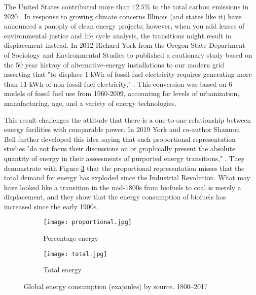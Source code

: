 The United States contributed more than $12.5\%$ to the total carbon emissions in 2020 \cite{european_commission_joint_research_centre_ghg_2021}. In response to growing climate concerns Illinois (and states like it) have announced a panoply of clean energy projects; however, when you add lenses of environmental justice and life cycle analysis, the transitions might result in displacement instead. In 2012 Richard York from the Oregon State Department of Sociology and Environmental Studies to published a cautionary study based on the 50 year histroy of alternative-energy installations to our modern grid asserting that "to displace 1 kWh of fossil-fuel electricity requires generating more than 11 kWh of non-fossil-fuel electricity," \cite{york_alternative_2012}. This conversion was based on 6 models of fossil fuel use from 1960-2009, accounting for levels of urbanization, manufacturing, age, and a variety of energy technologies.

This result challenges the attitude that there is a one-to-one relationship between energy facilities with comparable power. In 2019 York and co-author Shannon Bell further developed this idea saying that such proportional representation studies "do not focus their discussions on or graphically present the absolute quantity of energy in their assessments of purported energy transitions," \cite{york_energy_2019}. They demonstrate with Figure \ref{fig:both_plots} that the proportional representation misses that the total demand for energy has exploded since the Industrial Revolution. What may have looked like a transition in the mid-1800s from biofuels to coal is merely a displacement, and they show that the energy consumption of biofuels has increased since the early 1900s.

\begin{figure}[ht!]
  \begin{subfigure}{0.494\textwidth}
    \texttt{[image: proportional.jpg]}
    \caption{Percentage energy}
    \label{fig:first_plot}
  \end{subfigure}%
  \begin{subfigure}{0.515\textwidth}
    \texttt{[image: total.jpg]}
    \caption{Total energy}
    \label{fig:second_plot}
  \end{subfigure}
  \caption{Global energy consumption (exajoules) by source. 1800–2017 \cite{york_energy_2019}}
  \label{fig:both_plots}
\end{figure}

